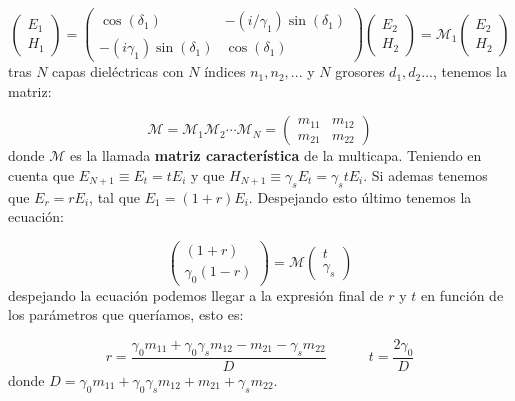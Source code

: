 \documentclass[12pt,a4paper]{book}
\numberwithin{equation}{section}
\numberwithin{figure}{section}
\newcommand{\tquad}{\quad \quad \quad}
\newcommand{\1}{_{(1)}}
\newcommand{\2}{_{(2)}}
\theoremstyle{definition}
\begin{document}
\begin{equation}
\begin{pmatrix}
E_1 \\
H_1
\end{pmatrix}
= 
\begin{pmatrix}
\cos (\delta_1) & -(i/\gamma_1)\sin (\delta_1) \\
-(i\gamma_1)\sin(\delta_1) & \cos (\delta_1 )
\end{pmatrix}
\begin{pmatrix}
E_2 \\
H_2
\end{pmatrix}
=
\mathcal{M}_1 
\begin{pmatrix}
E_2 \\
H_2
\end{pmatrix}
\end{equation}
tras $N$ capas dieléctricas con $N$ índices $n_1,n_2,...$ y $N$ grosores $d_1,d_2...$, tenemos la matriz:

\begin{equation}
\mathcal{M} = \mathcal{M}_1\mathcal{M}_2 \cdots \mathcal{M}_N = \begin{pmatrix}
m_{11} & m_{12} \\
m_{21} & m_{22}
\end{pmatrix}
\end{equation}
donde $\mathcal{M}$ es la llamada \textbf{matriz característica} de la multicapa. Teniendo en cuenta que $E_{N+1}\equiv E_t = tE_i$ y que $H_{N+1}\equiv \gamma_s E_t = \gamma_s t E_i$. Si ademas tenemos que $E_r=rE_i$, tal que $E_1=(1+r)E_i$. Despejando esto último tenemos la ecuación:


\begin{equation}
\begin{pmatrix}
(1+r) \\
\gamma_0 (1-r)
\end{pmatrix} = \mathcal{M}
\begin{pmatrix}
t \\
\gamma_s 
\end{pmatrix}
\end{equation}
despejando la ecuación podemos llegar a la expresión final de $r$ y $t$ en función de los parámetros que queríamos, esto es:

\begin{equation}
r=\frac{\gamma_0 m_{11} + \gamma_0 \gamma_s m_{12} - m_{21} - \gamma_s m_22}{D} \tquad t = \frac{2\gamma_0}{D}
\end{equation}
donde $D=\gamma_0 m_{11} + \gamma_0 \gamma_s m_{12} + m_{21} + \gamma_s m_{22}$. \\
\end{document}
